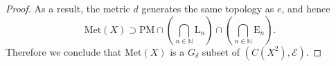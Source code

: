 \documentclass[10pt,a4paper]{amsart}
\newcommand{\met}[1]{\mathrm{Met}(#1)}
\newcommand{\nn}{\mathbb{N}}
\newcommand{\yoeset}[1]{\mathrm{E}_{#1}}
\newcommand{\yolset}[1]{\mathrm{L}_{#1}}
\newcommand{\yopset}{\mathrm{PM}}
\begin{document}
\begin{proof}
As a result, 
the metric 
$d$
 generates the same topology as 
 $e$,  
and hence 
\[
	\met{X}
	\supset 
	\yopset
	\cap 
	\left(
	\bigcap_{n\in \nn} \yolset{n}
	\right)
	\cap  
	\left(
	\bigcap_{n\in \nn}\yoeset{n}
	\right). 
\]
Therefore we conclude that 
$\met{X}$ 
is a 
$G_{\delta}$ 
subset of 
$(C(X^{2}), \mathcal{E})$. 
\end{proof}
\end{document}
